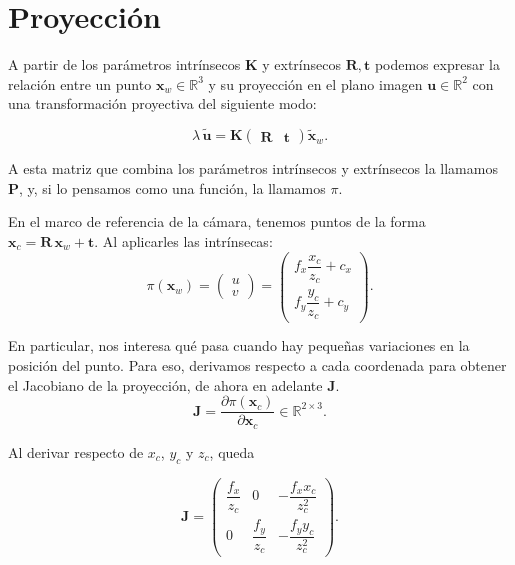 \section{Proyección}

A partir de los parámetros intrínsecos $\mathbf{K}$ y extrínsecos $\mathbf{R}, \mathbf{t}$ podemos expresar la relación entre un punto ${\mathbf{x}}_w \in \mathbb{R}^3$ y su proyección en el plano imagen $\mathbf{u} \in \mathbb{R}^2$ con una transformación proyectiva del siguiente modo:

\begin{equation}
\lambda \, \tilde{\mathbf{u}} =
\mathbf{K}
\begin{pmatrix}
\mathbf{R} & \mathbf{t}
\end{pmatrix}
\tilde{\mathbf{x}}_w.
\end{equation}

A esta matriz que combina los parámetros intrínsecos y extrínsecos la llamamos $\mathbf{P}$, y, si lo pensamos como una función, la llamamos $\pi$.

En el marco de referencia de la cámara, tenemos puntos de la forma $\mathbf{x}_c = \mathbf{R}\,\mathbf{x}_w + \mathbf{t}$. Al aplicarles las intrínsecas:
\begin{equation}
\pi(\mathbf{x}_w) =
\begin{pmatrix}
u \\
v
\end{pmatrix}
=
\begin{pmatrix}
f_x \dfrac{x_c}{z_c} + c_x \\
f_y \dfrac{y_c}{z_c} + c_y
\end{pmatrix}.
\label{proyeccion_pinhole}
\end{equation}

En particular, nos interesa qué pasa cuando hay pequeñas variaciones en la posición del punto. Para eso, derivamos respecto a cada coordenada para obtener el Jacobiano de la proyección, de ahora en adelante $\mathbf{J}$.
\begin{equation}
\mathbf{J}
=
\frac{\partial \pi(\mathbf{x}_c)}{\partial \mathbf{x}_c}
\in \mathbb{R}^{2 \times 3}.
\end{equation}

Al derivar respecto de $x_c$, $y_c$ y $z_c$, queda

\begin{equation}
\mathbf{J}
=
\begin{pmatrix}
\dfrac{f_x}{z_c} & 0 & -\dfrac{f_x x_c}{z_c^2} \\
0 & \dfrac{f_y}{z_c} & -\dfrac{f_y y_c}{z_c^2}
\end{pmatrix}.
\label{jacobiano_proyeccion_camara}
\end{equation}

